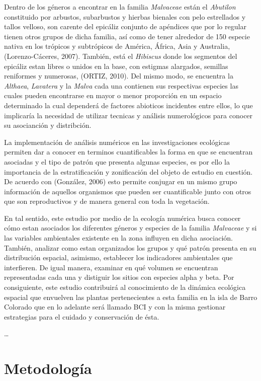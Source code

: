 \documentclass[11pt,]{article}
\begin{document}
Dentro de los géneros a encontrar en la familia \emph{Malvaceae} están
el \emph{Abutilon} constituido por arbustos, subarbustos y hierbas
bienales con pelo estrellados y tallos velloso, son carente del epicáliz
conjunto de apéndices que por lo regular tienen otros grupos de dicha
familia, así como de tener alrededor de 150 especie nativa en los
trópicos y subtrópicos de América, África, Asia y Australia,
(Lorenzo-Cáceres, 2007). También, está el \emph{Hibiscus} donde los
segmentos del epicáliz estan libres o unidos en la base, con estigmas
alargados, semillas reniformes y numerosas, (ORTIZ, 2010). Del mismo
modo, se encuentra la \emph{Althaea}, \emph{Lavatera} y la \emph{Malva}
cada una contienen sus respectivas especies las cuales pueden
encontrarse en mayor o menor proporción en un espacio determinado la
cual dependerá de factores abioticos incidentes entre ellos, lo que
implicaría la necesidad de utilizar tecnicas y análisis numerológicos
para conocer su asocianción y distribción.

La implementación de análisis numéricos en las investigaciones
ecológicas permiten dar a conocer en terminos cuantificables la forma en
que se encuentran asociadas y el tipo de patrón que presenta algunas
especies, es por ello la importancia de la estratificación y
zonificación del objeto de estudio en cuestión. De acuerdo con
(González, 2006) esto permite conjugar en un mismo grupo información de
aquellos organismos que pueden ser cuantificable junto con otros que son
reproductivos y de manera general con toda la vegetación.

En tal sentido, este estudio por medio de la ecología numérica busca
conocer cómo estan asociados los diferentes géneros y especies de la
familia \emph{Malvaceae} y si las variables ambientales existente en la
zona influyen en dicha asociación. También, analizar como estan
organizados los grupos y qué patrón presenta en su distribución
espacial, asimismo, establecer los indicadores ambientales que
interfieren. De igual manera, examinar en qué volumen se encuentran
representadas cada una y distiguir los sitios con especies alpha y beta.
Por consiguiente, este estudio contribuirá al conocimiento de la
dinámica ecológica espacial que envuelven las plantas pertenecientes a
esta familia en la isla de Barro Colorado que en lo adelante será
llamado BCI y con la misma gestionar estrategias para el cuidado y
conservación de ésta.

\ldots

\section{Metodología}\label{metodologuxeda}
\end{document}
